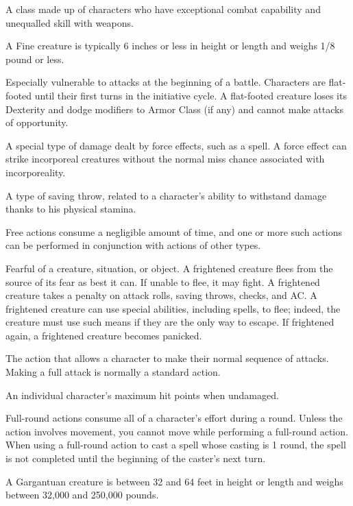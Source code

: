  A class made up of characters who have exceptional 
combat capability and unequalled skill with weapons. 

 A Fine creature is typically 6 inches or less in height or 
length and weighs 1/8 pound or less. 

 Especially vulnerable to attacks at the beginning of a 
battle. Characters are flat-footed until their first turns in the 
initiative cycle. A flat-footed creature loses its Dexterity and dodge modifiers to 
Armor Class (if any) and cannot make attacks of opportunity. 

 A special type of damage dealt by force effects, 
such as a  spell. A force effect can strike incorporeal creatures without the normal miss chance associated with incorporeality. 

 A type of saving throw, related to a character's 
ability to withstand damage thanks to his physical stamina. 

 Free actions consume a negligible amount of time, 
and one or more such actions can be performed in conjunction with 
actions of other types. 

 Fearful of a creature, situation, or object. A frightened creature flees from the source of its fear as best it can. If unable 
to flee, it may fight. A frightened creature takes a  penalty on
attack rolls, saving throws, checks, and AC. A 
frightened creature can use special abilities, including spells, to flee; 
indeed, the creature must use such means if they are the only way to 
escape. If frightened again, a frightened creature becomes panicked.

 The action that allows a character to make their normal sequence of attacks. Making a full attack is normally a standard action. 

 An individual character's maximum hit 
points when undamaged. 

 Full-round actions consume all of a character's effort during a round. Unless the action involves movement, you cannot move while performing a full-round action. When using a full-round action to cast a spell whose 
casting is 1 round, the spell is not completed until the beginning of 
the caster's next turn. 

 A Gargantuan creature is between 32 and 64 feet in 
height or length and weighs between 32,000 and 250,000 pounds. 

